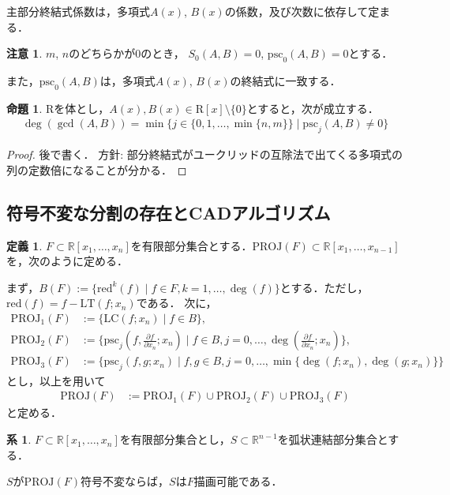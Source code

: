 \documentclass[uplatex, dvipdfmx]{jsarticle}
\newcommand{\R}{\mathbb{R}}
\newcommand{\psc}{\mathrm{psc}}
\newcommand{\PROJ}{\mathrm{PROJ}}
\theoremstyle{definition}
\newtheorem{definition}{定義}[section]
\newtheorem{proposition}{命題}[section]
\newtheorem{corollary}{系}[section]
\newtheorem{remark}{注意}[section]
\begin{document}
主部分終結式係数は，多項式$A(x)$, $B(x)$の係数，及び次数に依存して定まる．

\begin{remark}
$m$, $n$のどちらかが$0$のとき，
$S_0(A,B) = 0$, $\psc_0(A,B) = 0$とする．

また，$\psc_0(A,B)$は，多項式$A(x)$, $B(x)$の終結式に一致する．
\end{remark}

\begin{proposition}\label{proposition:psc}
$\mathrm{R}$を体とし，$A(x), B(x) \in \mathrm{R}[x] \setminus \{0\}$とすると，次が成立する．
\begin{align*}
\deg(\gcd(A, B)) = \min \{ j  \in \{0,1, \dots, \min\{n,m\}\}\mid \psc_j(A,B) \neq 0\}
\end{align*}
\end{proposition}

\begin{proof}
後で書く．
方針: 部分終結式がユークリッドの互除法で出てくる多項式の列の定数倍になることが分かる．


\end{proof}


\subsection{符号不変な分割の存在とCADアルゴリズム}
\begin{definition}
$F \subset \R[x_1, \dots, x_n]$を有限部分集合とする．$\PROJ(F) \subset \R[x_1, \dots, x_{n-1}]$を，次のように定める．

まず，$B(F) := \{ \mathrm{red}^k(f) \mid f \in F, k=1, \dots, \deg(f) \}$とする．ただし，$\mathrm{red}(f) = f - \mathrm{LT}(f; x_n)$である．
次に，
\begin{align*}
	\PROJ_1(F) &:= \{\mathrm{LC}(f;x_n) \mid f \in B\},\\
	\PROJ_2(F) &:= \{\psc_j(f, \frac{\partial f}{\partial x_n}; x_n) \mid f \in B, j =0, \dots, \deg(\frac{\partial f}{\partial x_n};x_n) \},\\
	\PROJ_3(F) &:= \{\psc_j(f,g;x_n) \mid f,g \in B, j = 0, \dots, \min\{\deg(f;x_n), \deg(g;x_n)\}\}
\end{align*}
とし，以上を用いて
\begin{align*}
	\PROJ(F) &:= \PROJ_1(F) \cup \PROJ_2(F) \cup \PROJ_3(F)
\end{align*}
と定める．
\end{definition}
\begin{corollary}
$F \subset \R[x_1, \dots, x_n]$を有限部分集合とし，$S \subset \R^{n-1}$を弧状連結部分集合とする．

$S$が$\PROJ(F)$符号不変ならば，$S$は$F$描画可能である．
\end{corollary}
\end{document}
